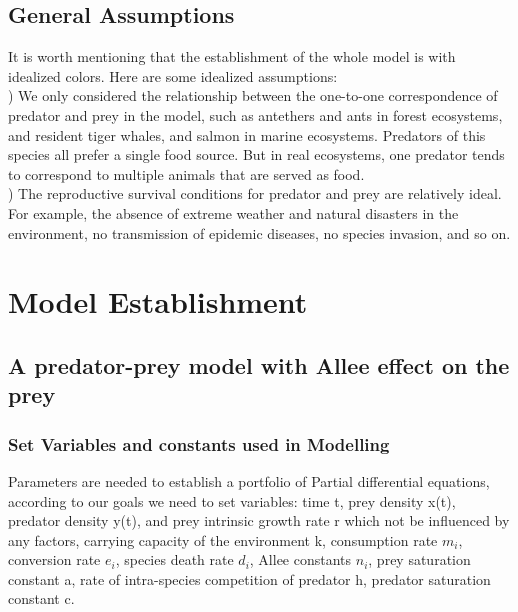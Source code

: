 \documentclass[12pt]{article}
\begin{document}
\subsection{General Assumptions}
\noindent It is worth mentioning that the establishment of the whole model is with idealized colors. Here are some idealized assumptions:\\

) We only considered the relationship between the one-to-one correspondence of predator and prey in the model, such as antethers and ants in forest ecosystems, and resident tiger whales, and salmon in marine ecosystems. Predators of this species all prefer a single food source. But in real ecosystems, one predator tends to correspond to multiple animals that are served as food.\\

) The reproductive survival conditions for predator and prey are relatively ideal. For example, the absence of extreme weather and natural disasters in the environment, no transmission of epidemic diseases, no species invasion, and so on.\\
\vspace{24pt}
\section{Model Establishment}
\subsection{A predator-prey model with Allee effect on the prey}
\subsubsection{Set Variables and constants used in Modelling}
\noindent Parameters are needed to establish a portfolio of Partial differential equations, according to our goals we need to set variables: time t, prey density x(t), predator density y(t), and prey intrinsic growth rate r which not be influenced by any factors, carrying capacity of the environment k, consumption rate $m_i$, conversion rate $e_i$, species death rate $d_i$, Allee constants $n_i$, prey saturation constant a, rate of intra-species competition of predator h, predator saturation constant c.
\end{document}
